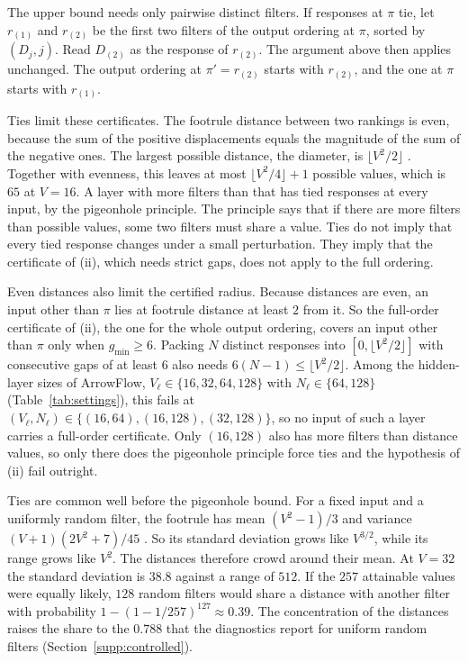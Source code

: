 The upper bound needs only pairwise distinct filters. If responses at $\pi$ tie, let $r_{(1)}$ and $r_{(2)}$ be the first two filters of the output ordering at $\pi$, sorted by $(D_j,j)$. Read $D_{(2)}$ as the response of $r_{(2)}$. The argument above then applies unchanged. The output ordering at $\pi'=r_{(2)}$ starts with $r_{(2)}$, and the one at $\pi$ starts with $r_{(1)}$.

Ties limit these certificates. The footrule distance between two rankings is even, because the sum of the positive displacements equals the magnitude of the sum of the negative ones. The largest possible distance, the diameter, is $\lfloor V^2/2\rfloor$ \citep{diaconis1977footrule}. Together with evenness, this leaves at most $\lfloor V^2/4\rfloor+1$ possible values, which is $65$ at $V=16$. A layer with more filters than that has tied responses at every input, by the pigeonhole principle. The principle says that if there are more filters than possible values, some two filters must share a value. Ties do not imply that every tied response changes under a small perturbation. They imply that the certificate of (ii), which needs strict gaps, does not apply to the full ordering.

Even distances also limit the certified radius. Because distances are even, an input other than $\pi$ lies at footrule distance at least $2$ from it. So the full-order certificate of (ii), the one for the whole output ordering, covers an input other than $\pi$ only when $g_{\min}\ge6$. Packing $N$ distinct responses into $[0,\lfloor V^2/2\rfloor]$ with consecutive gaps of at least $6$ also needs $6(N-1)\le\lfloor V^2/2\rfloor$. Among the hidden-layer sizes of ArrowFlow, $V_\ell\in\{16,32,64,128\}$ with $N_\ell\in\{64,128\}$ (Table~\ref{tab:settings}), this fails at $(V_\ell,N_\ell)\in\{(16,64),(16,128),(32,128)\}$, so no input of such a layer carries a full-order certificate. Only $(16,128)$ also has more filters than distance values, so only there does the pigeonhole principle force ties and the hypothesis of (ii) fail outright.

Ties are common well before the pigeonhole bound. For a fixed input and a uniformly random filter, the footrule has mean $(V^2-1)/3$ and variance $(V+1)(2V^2+7)/45$ \citep{diaconis1977footrule}. So its standard deviation grows like $V^{3/2}$, while its range grows like $V^2$. The distances therefore crowd around their mean. At $V=32$ the standard deviation is $38.8$ against a range of $512$. If the $257$ attainable values were equally likely, $128$ random filters would share a distance with another filter with probability $1-(1-1/257)^{127}\approx0.39$. The concentration of the distances raises the share to the $0.788$ that the diagnostics report for uniform random filters (Section~\ref{supp:controlled}).

